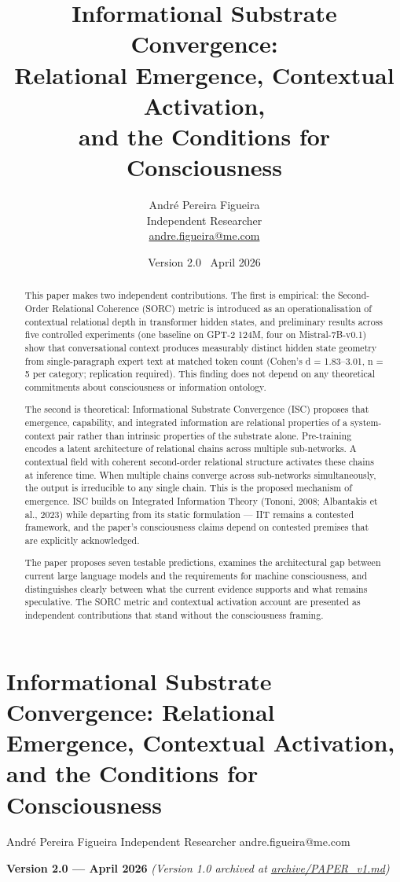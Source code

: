 \documentclass[12pt]{article}
\title{\textbf{Informational Substrate Convergence:}\\[4pt]
Relational Emergence, Contextual Activation,\\
and the Conditions for Consciousness}
\author{Andr\'{e} Pereira Figueira\\[4pt]
\small Independent Researcher\\[2pt]
\small \href{mailto:andre.figueira@me.com}{andre.figueira@me.com}}
\date{Version 2.0 \textemdash\ April 2026}
\begin{document}
\maketitle

\section{Informational Substrate Convergence: Relational Emergence,
Contextual Activation, and the Conditions for
Consciousness}\label{informational-substrate-convergence-relational-emergence-contextual-activation-and-the-conditions-for-consciousness}

André Pereira Figueira Independent Researcher andre.figueira@me.com

\textbf{Version 2.0 --- April 2026} \emph{(Version 1.0 archived at
\url{archive/PAPER_v1.md})}

\bigskip

\begin{abstract}
This paper makes two independent contributions. The first is empirical:
the Second-Order Relational Coherence (SORC) metric is introduced as an
operationalisation of contextual relational depth in transformer hidden
states, and preliminary results across five controlled experiments (one
baseline on GPT-2 124M, four on Mistral-7B-v0.1) show that
conversational context produces measurably distinct hidden state geometry
from single-paragraph expert text at matched token count (Cohen's d =
1.83--3.01, n = 5 per category; replication required). This finding does
not depend on any theoretical commitments about consciousness or
information ontology.

The second is theoretical: Informational Substrate Convergence (ISC)
proposes that emergence, capability, and integrated information are
relational properties of a system-context pair rather than intrinsic
properties of the substrate alone. Pre-training encodes a latent
architecture of relational chains across multiple sub-networks. A
contextual field with coherent second-order relational structure
activates these chains at inference time. When multiple chains converge
across sub-networks simultaneously, the output is irreducible to any
single chain. This is the proposed mechanism of emergence. ISC builds on
Integrated Information Theory (Tononi, 2008; Albantakis et al., 2023)
while departing from its static formulation --- IIT remains a contested
framework, and the paper's consciousness claims depend on contested
premises that are explicitly acknowledged.

The paper proposes seven testable predictions, examines the architectural
gap between current large language models and the requirements for
machine consciousness, and distinguishes clearly between what the current
evidence supports and what remains speculative. The SORC metric and
contextual activation account are presented as independent contributions
that stand without the consciousness framing.

\bigskip
\end{abstract}
\end{document}
